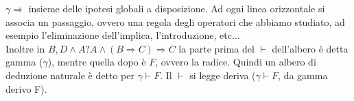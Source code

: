 \documentclass[12pt]{article}
\begin{document}
$\gamma \Rightarrow$ insieme delle ipotesi globali a disposizione. Ad ogni linea orizzontale si associa un passaggio, ovvero una regola degli operatori che abbiamo studiato, ad esempio l'eliminazione dell'implica, l'introduzione, etc$\dots$\\
Inoltre in $B,D \wedge A ? A \wedge (B \Rightarrow C) \Rightarrow C$ la parte prima del $\vdash$ dell'albero è detta gamma ($\gamma$), mentre quella dopo è $F$, ovvero la radice. Quindi un albero di deduzione naturale è detto per $\gamma \vdash F$. Il $\vdash$ si legge deriva ($\gamma \vdash F$, da gamma derivo F).\\
\end{document}
